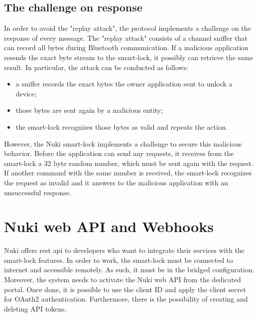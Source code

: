 \subsection{The challenge on response}
In order to avoid the "replay attack", the protocol implements a challenge on the response of every message. The "replay attack" consists of a channel sniffer that can record all bytes during Bluetooth communication. If a malicious application resends the exact byte stream to the smart-lock, it possibly can retrieve the same result. In particular, the attack can be conducted as follows: 
\begin{itemize}
    \item a sniffer records the exact bytes the owner application sent to unlock a device;
    \item those bytes are sent again by a malicious entity;
    \item the smart-lock recognizes those bytes as valid and repeats the action.
\end{itemize}
However, the Nuki smart-lock implements a challenge to secure this malicious behavior. Before the application can send any requests, it receives from the smart-lock a 32 byte random number, which must be sent again with the request. If another command with the same number is received, the smart-lock recognizes the request as invalid and it answers to the malicious application with an unsuccessful response.\cite{10.1007/978-3-031-21333-5_98}

\section{Nuki web API and Webhooks}
Nuki offers \acrshort{rest} \acrshort{api} to developers who want to integrate their services with the smart-lock features. In order to work, the smart-lock must be connected to internet and accessible remotely. As such, it must be in the bridged configuration.
\\ Moreover, the system needs to activate the Nuki web API from the dedicated portal. Once done, it is possible to use the client ID and apply the client secret for OAuth2 authentication. Furthermore, there is the possibility of creating and deleting API tokens.

